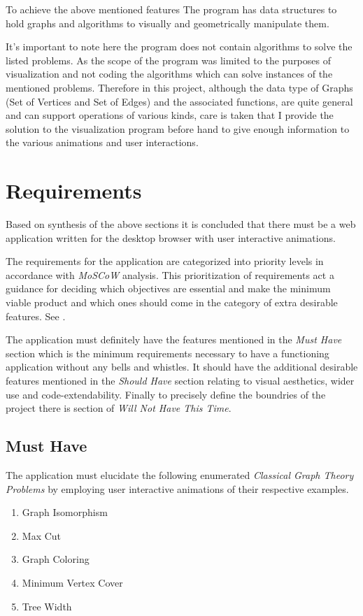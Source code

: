 To achieve the above mentioned features The program has data structures to hold
graphs and algorithms to visually and geometrically manipulate them. 

It's important to note here the program does not contain algorithms to solve
the listed problems. As the scope of the program was limited to the purposes of
visualization and not coding the algorithms which can solve instances of the
mentioned problems.  Therefore in this project, although the data type of
Graphs (Set of Vertices and Set of Edges) and the associated functions, are
quite general and can support operations of various kinds, care is taken that I
provide the solution to the visualization program before hand to give enough
information to the various animations and user interactions.


\section{Requirements}
\label{requirements: requirements}

Based on synthesis of the above sections it is concluded that there must be a
web application written for the desktop browser with user interactive
animations.  

The requirements for the application are categorized into priority
levels in accordance with \emph{MoSCoW} analysis. This prioritization of
requirements act a guidance for deciding which objectives are essential and
make the minimum viable product and which ones should come in the category of
extra desirable features. See \cite{Hudaib2018}.

The application must definitely have the features mentioned in the \emph{Must
Have} section which is the minimum requirements necessary to have a functioning
application without any bells and whistles. It should have the additional
desirable features mentioned in the \emph{Should Have} section relating to
visual aesthetics, wider use and code-extendability.  Finally to precisely
define the boundries of the project there is section of \emph{Will Not Have
This Time}.

\subsection{Must Have}
\label{requirements: musthave}
The application must elucidate the following enumerated \emph{Classical Graph Theory
Problems} by employing user interactive animations of their respective examples.
\begin{enumerate}
\item Graph Isomorphism
\item Max Cut
\item Graph Coloring
\item Minimum Vertex Cover
\item Tree Width
\end{enumerate}

